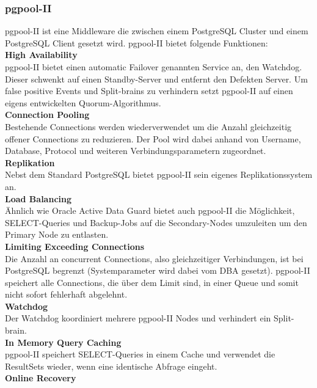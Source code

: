 
\subsubsection{pgpool-II}
pgpool-II ist eine Middleware die zwischen einem \Gls{PostgreSQL Cluster} und einem PostgreSQL Client gesetzt wird.
pgpool-II bietet folgende Funktionen\cite{EXVNLICT,3XWCD3KX}:
\\\textbf{High Availability}\\
pgpool-II bietet einen automatic \Gls{Failover} genannten Service an, den Watchdog.
Dieser schwenkt auf einen Standby-Server und entfernt den Defekten Server.
Um false positive Events und Split-brains zu verhindern setzt pgpool-II auf einen eigens entwickelten \Gls{Quorum}-Algorithmus.
\\\textbf{Connection Pooling}\\
Bestehende Connections werden wiederverwendet um die Anzahl gleichzeitig offener Connections zu reduzieren.
Der Pool wird dabei anhand von Username, Database, Protocol und weiteren Verbindungsparametern zugeordnet.
\\\textbf{Replikation}\\
Nebst dem Standard \Gls{PostgreSQL} bietet pgpool-II sein eigenes Replikationssystem an.
\\\textbf{Load Balancing}\\
Ähnlich wie Oracle Active Data Guard \cite{6294443C} bietet auch pgpool-II die Möglichkeit, SELECT-Queries und Backup-Jobs auf die Secondary-Nodes umzuleiten um den Primary Node zu entlasten.
\\\textbf{Limiting Exceeding Connections}\\
Die Anzahl an concurrent Connections, also gleichzeitiger Verbindungen, ist bei \Gls{PostgreSQL} begrenzt (Systemparameter wird dabei vom DBA gesetzt).
pgpool-II speichert alle Connections, die über dem Limit sind, in einer Queue und somit nicht sofort fehlerhaft abgelehnt.
\\\textbf{Watchdog}\\
Der Watchdog koordiniert mehrere pgpool-II Nodes und verhindert ein Split-brain.
\\\textbf{In Memory Query Caching}\\
pgpool-II speichert SELECT-Queries in einem Cache und verwendet die ResultSets wieder, wenn eine identische Abfrage eingeht.
\\\textbf{Online Recovery}\\
